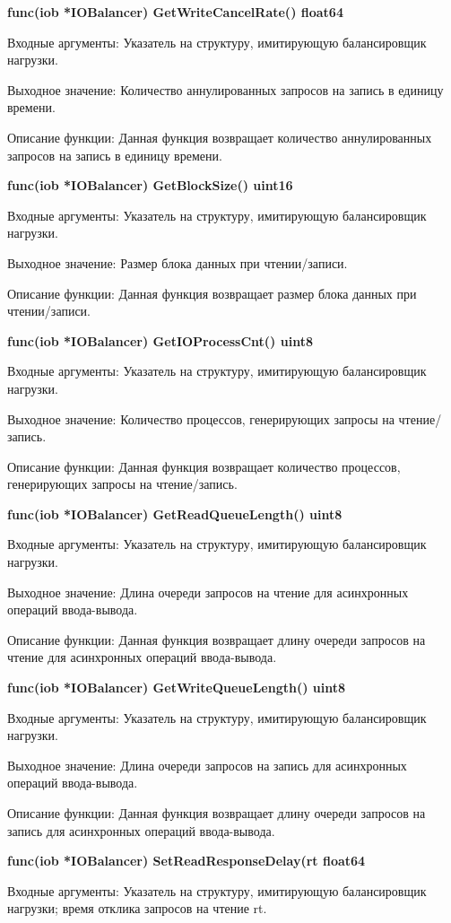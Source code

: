 \textbf{func(iob *IOBalancer) GetWriteCancelRate() float64}

Входные аргументы: Указатель на структуру, имитирующую балансировщик нагрузки.

Выходное значение: Количество аннулированных запросов на запись в единицу времени. 

Описание функции: Данная функция возвращает количество аннулированных запросов на запись в единицу времени.

\textbf{func(iob *IOBalancer) GetBlockSize() uint16}

Входные аргументы: Указатель на структуру, имитирующую балансировщик нагрузки.

Выходное значение:  Размер блока данных при чтении/записи.

Описание функции: Данная функция возвращает  размер блока данных при чтении/записи.

\textbf{func(iob *IOBalancer) GetIOProcessCnt() uint8}

Входные аргументы: Указатель на структуру, имитирующую балансировщик нагрузки.

Выходное значение: Количество процессов, генерирующих запросы на чтение/запись.

Описание функции: Данная функция возвращает количество процессов, генерирующих запросы на чтение/запись.

\textbf{func(iob *IOBalancer) GetReadQueueLength() uint8}

Входные аргументы: Указатель на структуру, имитирующую балансировщик нагрузки.

Выходное значение: Длина очереди запросов на чтение для асинхронных операций ввода-вывода.

Описание функции: Данная функция возвращает длину очереди запросов на чтение для асинхронных операций ввода-вывода.

\textbf{func(iob *IOBalancer) GetWriteQueueLength() uint8}

Входные аргументы: Указатель на структуру, имитирующую балансировщик нагрузки.

Выходное значение: Длина очереди запросов на запись для асинхронных операций ввода-вывода. 

Описание функции: Данная функция возвращает длину очереди запросов на запись для асинхронных операций ввода-вывода.

\textbf{func(iob *IOBalancer) SetReadResponseDelay(rt float64}

Входные аргументы: Указатель на структуру, имитирующую балансировщик нагрузки; время отклика запросов на чтение rt.

